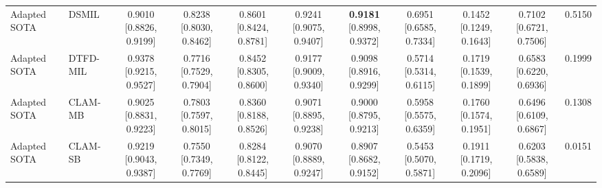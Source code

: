 \documentclass[Afour,sagev,times]{sagej}
\begin{document}
\begin{table}[t]
{\begin{tabular}{ll*{9}{c}}
Adapted SOTA & DSMIL & \shortstack{0.9010\\{[}0.8826, 0.9199{]}} & \shortstack{0.8238\\{[}0.8030, 0.8462{]}} & \shortstack{0.8601\\{[}0.8424, 0.8781{]}} & \shortstack{0.9241\\{[}0.9075, 0.9407{]}} & \shortstack{\textbf{0.9181}\\{[}0.8998, 0.9372{]}} & \shortstack{0.6951\\{[}0.6585, 0.7334{]}} & \shortstack{0.1452\\{[}0.1249, 0.1643{]}} & \shortstack{0.7102\\{[}0.6721, 0.7506{]}} & 0.5150 \\
Adapted SOTA & DTFD-MIL & \shortstack{0.9378\\{[}0.9215, 0.9527{]}} & \shortstack{0.7716\\{[}0.7529, 0.7904{]}} & \shortstack{0.8452\\{[}0.8305, 0.8600{]}} & \shortstack{0.9177\\{[}0.9009, 0.9340{]}} & \shortstack{0.9098\\{[}0.8916, 0.9299{]}} & \shortstack{0.5714\\{[}0.5314, 0.6115{]}} & \shortstack{0.1719\\{[}0.1539, 0.1899{]}} & \shortstack{0.6583\\{[}0.6220, 0.6936{]}} & 0.1999 \\
Adapted SOTA & CLAM-MB & \shortstack{0.9025\\{[}0.8831, 0.9223{]}} & \shortstack{0.7803\\{[}0.7597, 0.8015{]}} & \shortstack{0.8360\\{[}0.8188, 0.8526{]}} & \shortstack{0.9071\\{[}0.8895, 0.9238{]}} & \shortstack{0.9000\\{[}0.8795, 0.9213{]}} & \shortstack{0.5958\\{[}0.5575, 0.6359{]}} & \shortstack{0.1760\\{[}0.1574, 0.1951{]}} & \shortstack{0.6496\\{[}0.6109, 0.6867{]}} & 0.1308 \\
Adapted SOTA & CLAM-SB & \shortstack{0.9219\\{[}0.9043, 0.9387{]}} & \shortstack{0.7550\\{[}0.7349, 0.7769{]}} & \shortstack{0.8284\\{[}0.8122, 0.8445{]}} & \shortstack{0.9070\\{[}0.8889, 0.9247{]}} & \shortstack{0.8907\\{[}0.8682, 0.9152{]}} & \shortstack{0.5453\\{[}0.5070, 0.5871{]}} & \shortstack{0.1911\\{[}0.1719, 0.2096{]}} & \shortstack{0.6203\\{[}0.5838, 0.6589{]}} & 0.0151 \\
\bottomrule
\end{tabular}
}
\end{table}
\end{document}
